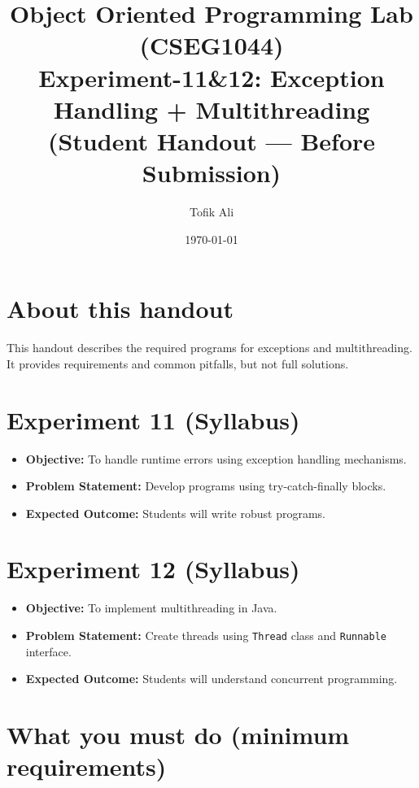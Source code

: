 \documentclass[11pt]{article}
\title{Object Oriented Programming Lab (CSEG1044)\\Experiment-11\&12: Exception Handling + Multithreading (Student Handout --- Before Submission)}
\author{Tofik Ali}
\date{\today}
\begin{document}
\maketitle
\tableofcontents

\section{About this handout}
This handout describes the required programs for exceptions and multithreading.
It provides requirements and common pitfalls, but not full solutions.

\section{Experiment 11 (Syllabus)}
\begin{itemize}[leftmargin=*]
  \item \textbf{Objective:} To handle runtime errors using exception handling mechanisms.
  \item \textbf{Problem Statement:} Develop programs using try-catch-finally blocks.
  \item \textbf{Expected Outcome:} Students will write robust programs.
\end{itemize}

\section{Experiment 12 (Syllabus)}
\begin{itemize}[leftmargin=*]
  \item \textbf{Objective:} To implement multithreading in Java.
  \item \textbf{Problem Statement:} Create threads using \texttt{Thread} class and \texttt{Runnable} interface.
  \item \textbf{Expected Outcome:} Students will understand concurrent programming.
\end{itemize}

\section{What you must do (minimum requirements)}
\end{document}
